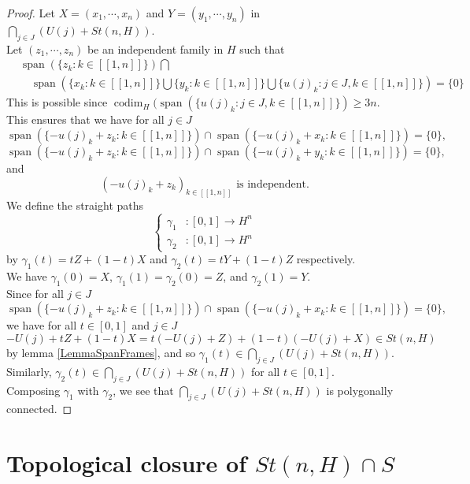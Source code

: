 \documentclass[a4paper,12pt]{article}
\DeclareMathOperator{\Span}{span}
\DeclareMathOperator{\codim}{codim}
\theoremstyle{plain}
\theoremstyle{definition}
\theoremstyle{remark}
\begin{document}
\begin{proof}
Let $X = (x_1,\cdots,x_n)$ and $Y = (y_1,\cdots,y_n)$ in $\bigcap_{j \in J} (U(j) + St(n,H))$. \\
Let $(z_1, \cdots, z_n)$ be an independent family in $H$ such that
\begin{align*}
&\Span(\{z_k : k \in [\![1,n]\!]\}) \bigcap \\
&\quad \Span\left(\{x_k : k \in [\![1,n]\!]\} \bigcup \{y_k : k \in [\![1,n]\!]\} \bigcup \{u(j)_k : j \in J, k \in [\![1,n]\!]\} \right) = \{0\}
\end{align*}
This is possible since $\codim_H(\Span(\{u(j)_k : j \in J, k \in [\![1,n]\!]\}) \geq 3n$. \\
This ensures that we have for all $j \in J$
\[ \Span( \{-u(j)_k + z_k : k \in [\![1,n]\!] \}) \cap \Span(\{-u(j)_k + x_k : k \in [\![1,n]\!]\}) = \{0\}, \]
\[ \Span( \{-u(j)_k + z_k : k \in [\![1,n]\!] \}) \cap \Span(\{-u(j)_k + y_k : k \in [\![1,n]\!]\}) = \{0\}, \]
and 
\[ (-u(j)_k + z_k)_{k \in [\![1,n]\!]} \text{ is independent.} \]
We define the straight paths 
\[
\begin{cases} \gamma_1 &: [0,1] \to H^n \\
\gamma_2 &: [0,1] \to H^n \end{cases}
\]
by $\gamma_1(t) = tZ + (1-t)X$ and $\gamma_2(t) = tY + (1-t)Z$ respectively.  \\
We have $\gamma_1(0)=X$, $\gamma_1(1)=\gamma_2(0)=Z$, and $\gamma_2(1)=Y$. \\
Since for all $j \in J$
\[ \Span( \{-u(j)_k + z_k : k \in [\![1,n]\!] \}) \cap \Span(\{-u(j)_k + x_k : k \in [\![1,n]\!]\}) = \{0\}, \]
we have for all $t \in [0,1]$ and $j \in J$ 
\[ -U(j) + tZ + (1-t)X = t(-U(j) + Z) + (1-t)(-U(j) + X) \in St(n,H) \]
by lemma \ref{LemmaSpanFrames}, and so $\gamma_1(t) \in \bigcap_{j \in J} (U(j) + St(n,H))$. \\
Similarly, $\gamma_2(t) \in \bigcap_{j \in J} (U(j) + St(n,H))$ for all $t \in [0,1]$. \\
Composing $\gamma_1$ with $\gamma_2$, we see that $\bigcap_{j \in J} (U(j) + St(n,H))$ is polygonally connected.
\end{proof}














\section{Topological closure of $St(n,H) \cap S$}
\label{SectionRelativeDensity}
\end{document}
